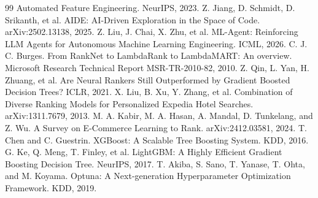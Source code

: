 \documentclass[]{ceurart}
\begin{document}
\begin{thebibliography}{99}
Automated Feature Engineering. NeurIPS, 2023.
 Z. Jiang, D. Schmidt, D. Srikanth, et al. AIDE: AI-Driven
Exploration in the Space of Code. arXiv:2502.13138, 2025.
 Z. Liu, J. Chai, X. Zhu, et al. ML-Agent: Reinforcing LLM
Agents for Autonomous Machine Learning Engineering. ICML, 2026.
 C. J. C. Burges. From RankNet to LambdaRank to
LambdaMART: An overview. Microsoft Research Technical Report MSR-TR-2010-82,
2010.
 Z. Qin, L. Yan, H. Zhuang, et al. Are Neural Rankers
Still Outperformed by Gradient Boosted Decision Trees? ICLR, 2021.
 X. Liu, B. Xu, Y. Zhang, et al. Combination of Diverse
Ranking Models for Personalized Expedia Hotel Searches. arXiv:1311.7679,
2013.
 M. A. Kabir, M. A. Hasan, A. Mandal, D. Tunkelang, and
Z. Wu. A Survey on E-Commerce Learning to Rank. arXiv:2412.03581, 2024.
 T. Chen and C. Guestrin. XGBoost: A Scalable Tree Boosting
System. KDD, 2016.
 G. Ke, Q. Meng, T. Finley, et al. LightGBM: A Highly
Efficient Gradient Boosting Decision Tree. NeurIPS, 2017.
 T. Akiba, S. Sano, T. Yanase, T. Ohta, and M. Koyama.
Optuna: A Next-generation Hyperparameter Optimization Framework. KDD, 2019.
\end{thebibliography}
\end{document}
